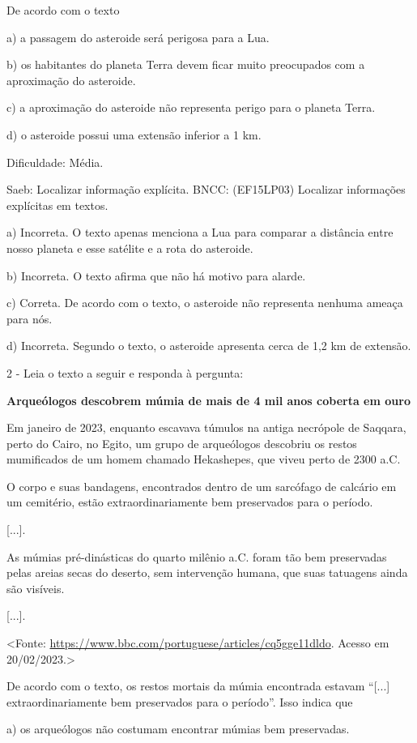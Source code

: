 De acordo com o texto

a) a passagem do asteroide será perigosa para a Lua.

b) os habitantes do planeta Terra devem ficar muito preocupados com a
aproximação do asteroide.

c) a aproximação do asteroide não representa perigo para o planeta
Terra.

d) o asteroide possui uma extensão inferior a 1 km.

Dificuldade: Média.

Saeb: Localizar informação explícita. BNCC: (EF15LP03) Localizar
informações explícitas em textos.

a) Incorreta. O texto apenas menciona a Lua para comparar a distância
entre nosso planeta e esse satélite e a rota do asteroide.

b) Incorreta. O texto afirma que não há motivo para alarde.

c) Correta. De acordo com o texto, o asteroide não representa nenhuma
ameaça para nós.

d) Incorreta. Segundo o texto, o asteroide apresenta cerca de 1,2 km de
extensão.

2 - Leia o texto a seguir e responda à pergunta:

\textbf{Arqueólogos descobrem múmia de mais de 4 mil anos coberta em
ouro}

Em janeiro de 2023, enquanto escavava túmulos na antiga necrópole de
Saqqara, perto do Cairo, no Egito, um grupo de arqueólogos descobriu os
restos mumificados de um homem chamado Hekashepes, que viveu perto de
2300 a.C.

O corpo e suas bandagens, encontrados dentro de um sarcófago de calcário
em um cemitério, estão extraordinariamente bem preservados para o
período.

{[}...{]}.

As múmias pré-dinásticas do quarto milênio a.C. foram tão bem
preservadas pelas areias secas do deserto, sem intervenção humana, que
suas tatuagens ainda são visíveis.

{[}...{]}.

\textless{}Fonte:
\url{https://www.bbc.com/portuguese/articles/cq5gge11dldo}. Acesso em
20/02/2023.\textgreater{}

De acordo com o texto, os restos mortais da múmia encontrada estavam
``{[}...{]} extraordinariamente bem preservados para o período''. Isso
indica que

a) os arqueólogos não costumam encontrar múmias bem preservadas.

